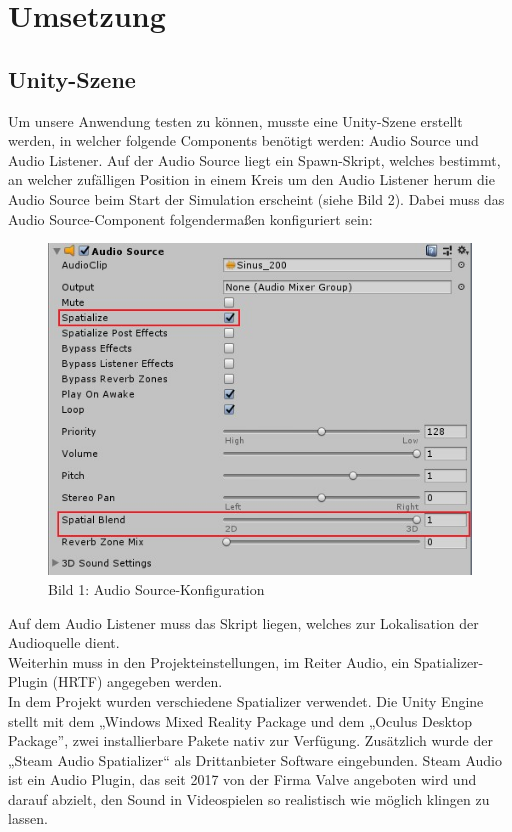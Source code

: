 \documentclass[12pt,a4paper]{article}
\begin{document}
\section{Umsetzung}
\subsection{Unity-Szene}
Um unsere Anwendung testen zu können, musste eine Unity-Szene erstellt werden, in welcher folgende Components benötigt werden: Audio Source und Audio Listener. Auf der Audio Source liegt ein Spawn-Skript, welches bestimmt, an welcher zufälligen Position in einem Kreis um den Audio Listener herum die Audio Source beim Start der Simulation erscheint (siehe Bild 2). Dabei muss das Audio Source-Component folgendermaßen konfiguriert sein:

\begin{figure}[h!]
\centering
\includegraphics[scale=0.6]{setup2}
\caption{Bild 1: Audio Source-Konfiguration}
\end{figure}

Auf dem Audio Listener muss das Skript liegen, welches zur Lokalisation der Audioquelle dient.\\
Weiterhin muss in den Projekteinstellungen, im Reiter Audio, ein Spatializer-Plugin (HRTF) angegeben werden.\\
In dem Projekt wurden verschiedene Spatializer verwendet. Die Unity Engine stellt mit dem „Windows Mixed Reality Package und dem „Oculus Desktop Package”, zwei installierbare Pakete nativ zur Verfügung. Zusätzlich wurde der „Steam Audio Spatializer“ als Drittanbieter Software eingebunden. Steam Audio ist ein Audio Plugin, das seit 2017 von der Firma Valve angeboten wird und darauf abzielt, den Sound in Videospielen so realistisch wie möglich klingen zu lassen.\\
\end{document}
